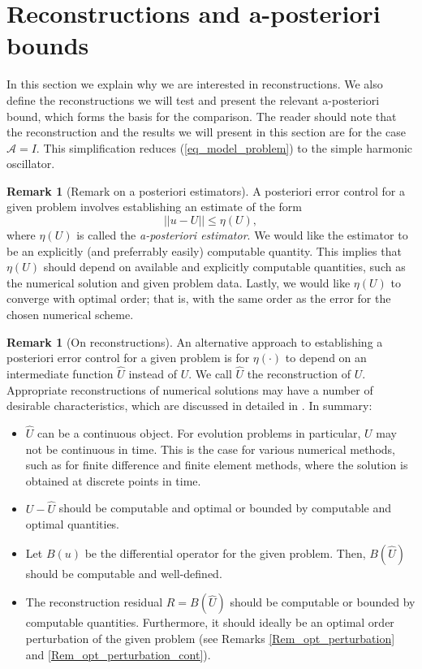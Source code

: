 \documentclass[12pt,a4paper]{article}
\numberwithin{equation}{section}
\theoremstyle{definition}
\newcommand{\qp}[1]{\left(#1\right)}
\newcommand{\rec}[1]{\widehat{{#1}}}
\newcommand{\Normgs}[1]{\left|\left|#1\right|\right|}
\newtheorem{Rem}[subsection]{Remark}
\begin{document}
\section{Reconstructions and a-posteriori bounds}\label{sec_bounds}
In this section we explain why we are interested in reconstructions.  We  also define the  reconstructions we will test and  present the relevant a-posteriori bound, which forms the basis for the comparison.  The reader should note that the reconstruction and the results we will present in this section are for the case $\mathcal{A}=I$.  This simplification reduces (\ref{eq_model_problem}) to the simple harmonic oscillator.
\begin{Rem}[Remark on a posteriori estimators]\label{rem_apost_estimator}
 A posteriori error control for a given problem involves establishing an estimate of the form 
\begin{equation}\label{eq_error_estimate}
\Normgs{u-U}\leq \eta\qp{U},
\end{equation}
where $\eta\qp{U}$ is called the\textit{ a-posteriori estimator}.  We would like the estimator to be an explicitly (and preferrably easily) computable quantity.  This implies that $\eta\qp{U}$ should depend on available and explicitly computable quantities, such as the numerical solution  and given problem data. Lastly, we would like $\eta\qp{U}$ to converge with optimal order; that is, with the same order as the error for the chosen numerical scheme.  
\end{Rem}

\begin{Rem}[On reconstructions]
An alternative approach to establishing a posteriori error control for a given problem is for $\eta\qp{\cdot}$ to depend on an intermediate function $\rec{U}$ instead of $U$.   We call $\rec{U}$ the reconstruction of $U$.  Appropriate reconstructions of numerical solutions may have a number of desirable characteristics, which are discussed in detailed in \cite{makridakis2007space}.  In summary:
\begin{itemize}
\item $\rec{U}$ can be a continuous object.  For evolution problems in particular, $U$ may not be continuous in time.  This is the case for various numerical methods, such as for finite difference and finite element methods, where the solution is obtained at discrete points in time.
\item $U-\rec{U}$ should be computable and optimal or bounded by computable and optimal quantities.
\item Let $B\qp{u}$ be the differential operator for the given problem.  Then, $B\qp{\rec{U}}$ should be computable and well-defined.
\item The reconstruction residual $R=B\qp{\rec{U}}$ should be computable or bounded by computable quantities.  Furthermore, it should ideally be an optimal order perturbation of the given problem (see Remarks \ref{Rem_opt_perturbation} and \ref{Rem_opt_perturbation_cont}).
\end{itemize}
\end{Rem}
\end{document}
